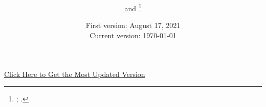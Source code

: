 \documentclass[12pt,english]{article}
\begin{document}
\title{
\onehalfspacing
\PAPERTITLE
}

\author{
\AUTHORHADAH{} and \AUTHORCOMP{}\thanks{
\AUTHORHADAHINFO;
\AUTHORCOMPINFO.
\ACKNOWLEDGMENTS
}}

\date{
    First version: August 17, 2021 \\
    Current version: \today
}

\maketitle

\begin{center}
\href{https://hhadah.github.io/asian-identity-attrition/my_paper/submit_preprint.pdf}{\footnotesize{Click Here to Get the Most Updated Version}}
\end{center}

\begin{abstract}
\singlespacing
\PAPERABSTRACT
\end{abstract}
\vfil
\hfil \small\PAPERKEYWORDS \hfil
\vfil
\thispagestyle{empty}
\clearpage

\setcounter{page}{1}
\renewcommand*{\thefootnote}{\arabic{footnote}}

\clearpage

\begingroup
{}
\setlength\bibitemsep{5pt}
\printbibliography[title=References]
\endgroup
\pagebreak



\appendix
\setlength{\footnotemargin}{5.75mm}



% 
\clearpage
\end{document}
